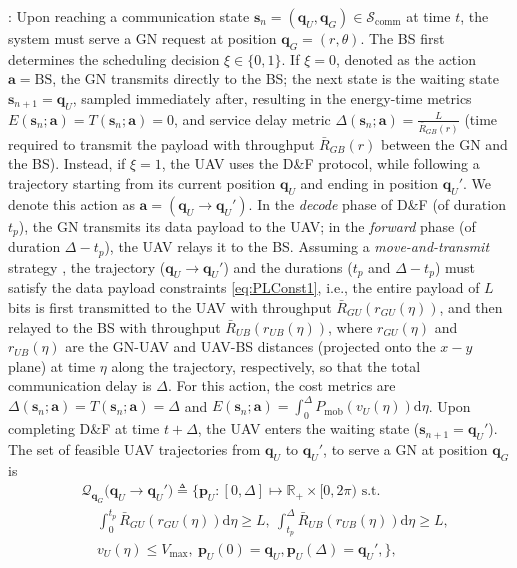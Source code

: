 \documentclass[10pt, twocolumn]{IEEEtran}
\theoremstyle{plain}
\theoremstyle{definition}
\theoremstyle{remark}
\begin{document}
: Upon reaching a communication state $\mathbf{s}_{n}{=}(\mathbf{q}_{U},\mathbf{q}_{G}){\in}\mathcal{S}_{\mathrm{comm}}$ at time $t$, the system must serve a GN request at position $\mathbf{q}_{G}{=}(r,\theta)$. The BS first determines the scheduling decision $\xi{\in}\{0,1\}$. If $\xi{=}0$,
 denoted as the action $\mathbf a{=}\mathrm{BS}$,
 the GN transmits directly to the BS; the next state is 
the waiting state $\mathbf{s}_{n{+}1}{=}\mathbf{q}_{U}$, sampled immediately after, resulting in the energy-time metrics
$E(\mathbf{s}_{n};\mathbf{a}){=}T(\mathbf{s}_{n};\mathbf{a}){=}0$, and service delay metric $\Delta(\mathbf{s}_{n};\mathbf{a}){=}\frac{L}{\bar R_{GB}(r)}$ (time required to transmit the payload with throughput $\bar R_{GB}(r)$ between the GN and the BS).
Instead, if $\xi{=}1$, the UAV uses the D\&F protocol, while following a trajectory starting from its current position $\mathbf{q}_{U}$ and ending in position $\mathbf{q}_{U}'$. We denote this action as $\mathbf a{=}(\mathbf q_U{\rightarrow}\mathbf q_{U}')$. In the \emph{decode} phase of D\&F (of duration $t_{p}$), the GN transmits its data payload to the UAV; in the \emph{forward} phase (of duration $\Delta{-}t_{p}$), the UAV relays it to the BS. Assuming a \emph{move-and-transmit} strategy \cite{SCA}, the trajectory ($\mathbf{q}_{U}{\rightarrow}{\mathbf{q}}_{U}'$) and the durations ($t_{p}$ and $\Delta{-}t_{p}$) must satisfy the data payload constraints \eqref{eq:PLConst1}, i.e., the entire payload of $L$ bits is first transmitted to the UAV with throughput $\bar R_{GU}(r_{GU}(\eta))$, and then relayed to the BS
with throughput $\bar{R}_{UB}(r_{UB}(\eta))$, where
 $r_{GU}({\eta})$  and $r_{UB}(\eta)$ are the GN-UAV and UAV-BS distances (projected onto the $x{-}y$ plane) at time $\eta$ along the trajectory, respectively, so that the total communication delay is $\Delta$. For this action, the cost metrics are $\Delta(\mathbf{s}_{n};\mathbf{{a}}){=}T(\mathbf{s}_{n};\mathbf{{a}}){=}\Delta$ and $E(\mathbf{s}_{n};\mathbf{{a}}){=}\int_{0}^{\Delta}P_{\mathrm{mob}}\left(v_{U}(\eta)\right)\mathrm{d}\eta$. Upon completing D\&F at time $t{+}\Delta$, the UAV enters the waiting state ($\mathbf{s}_{n{+}1}{=}\mathbf{q}_{U}'$). The set of feasible UAV trajectories from $\mathbf{q}_{U}$ to $\mathbf{q}_{U}'$, to serve a GN at position $\mathbf{q}_{G}$ is
\begin{align}
\label{eq12}
&	\mathcal{Q}_{\mathbf q_G} \big({\mathbf q}_U\rightarrow{\mathbf q}_U'\big) \triangleq \Big\{ \mathbf{p}_{U} : [0,\Delta] \mapsto \mathbb{R}_{+} \times[0,2\pi)\text{ s.t.}\\
	& \;\;\;\; \int_{0}^{t_{p}} \bar{R}_{GU}(r_{GU}(\eta)) \mathrm d \eta \geq L, \ \int_{t_p}^{\Delta} \bar R_{UB}(r_{UB}(\eta)) \mathrm d \eta \geq L, \label{eq:PLConst1}\tag{C.1}\\
	& \;\;\;\; v_U (\eta) \leq V_{\mathrm{max}},\ 
\mathbf{p}_{U}(0) ={\mathbf q}_U, \mathbf{p}_{U}(\Delta) ={\mathbf q}_U',\label{eq:IFConst1}\Big\},\tag{C.2}
\end{align}
\end{document}
